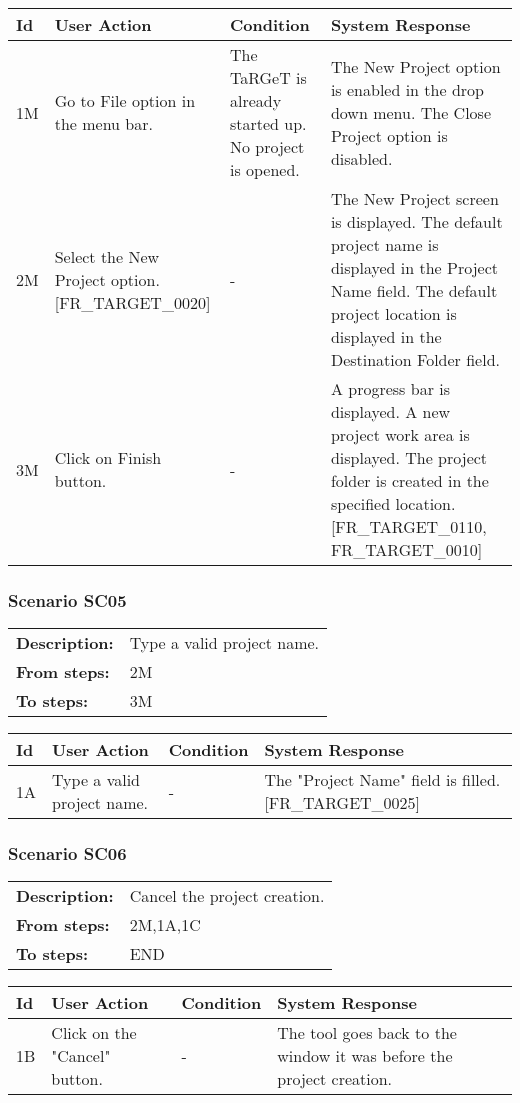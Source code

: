 \documentclass[a4paper,11pt]{article}
\newcommand{\bl}{\\ \hline}
\begin{document}
\begin{tabular}{|p{0.8in}|p{1.6in}|p{1.6in}|p{1.6in}|}
\hline
Id & User Action & Condition & System Response  \bl 
1M & Go to File option in the menu bar. & The TaRGeT is already started up. No project is opened.
					 & The New Project option is enabled in the drop down
						menu.
						The Close Project option is disabled. \bl 
2M & Select the New Project option. [FR_TARGET_0020] & - & The New Project screen is displayed. The default
						project
						name is displayed in the Project Name field. The default
						project
						location is displayed in the Destination Folder field.
					 \bl 
3M & Click on Finish button. & - & A progress bar is displayed. A new project work area is
						displayed. The project folder is created in the specified
						location. [FR_TARGET_0110, FR_TARGET_0010] \bl 
\end{tabular}
\subsubsection*{Scenario SC05}
\begin{tabular}{p{1in}p{4in}}
{\bf Description:} & Type a valid project name. \\
{\bf From steps:} & 2M \\
{\bf To steps:} & 3M \\
\end{tabular}
 
\begin{tabular}{|p{0.8in}|p{1.6in}|p{1.6in}|p{1.6in}|}
\hline
Id & User Action & Condition & System Response  \bl 
1A & Type a valid project name. & - & The "Project Name" field is filled. [FR_TARGET_0025]
					 \bl 
\end{tabular}
\subsubsection*{Scenario SC06}
\begin{tabular}{p{1in}p{4in}}
{\bf Description:} & Cancel the project creation. \\
{\bf From steps:} & 2M,1A,1C \\
{\bf To steps:} & END \\
\end{tabular}
 
\begin{tabular}{|p{0.8in}|p{1.6in}|p{1.6in}|p{1.6in}|}
\hline
Id & User Action & Condition & System Response  \bl 
1B & Click on the "Cancel" button. & - & The tool goes back to the window it was before the
						project creation. \bl 
\end{tabular}
\end{document}
